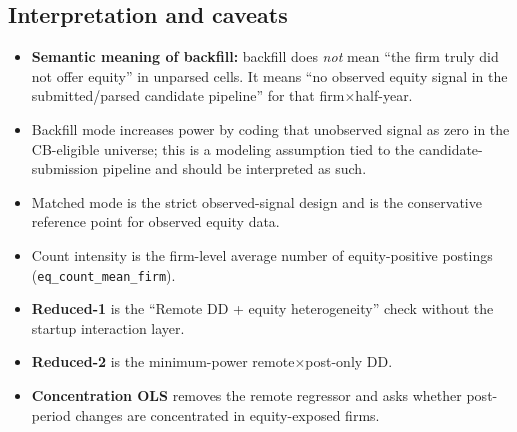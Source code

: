 \documentclass{article}
\newcommand{\cleanedresultsdir}{../../results/cleaned/tex}
\newcommand{\TableInput}[2][\linewidth]{}
\begin{document}
\begin{table}[H]
  \centering
  \caption{User productivity: reduced-2 (Remote $\times$ Post only DD)}
  \TableInput{\cleanedresultsdir/llm_equity_cb_modes_user_simple_dd.tex}
\end{table}

\begin{table}[H]
  \centering
  \caption{User productivity: concentration OLS (equity exposure $\times$ post, extensive margin)}
  \TableInput{\cleanedresultsdir/llm_equity_cb_modes_user_concentration_any.tex}
\end{table}

\begin{table}[H]
  \centering
  \caption{User productivity: concentration OLS (equity exposure $\times$ post, share intensity)}
  \TableInput{\cleanedresultsdir/llm_equity_cb_modes_user_concentration_share.tex}
\end{table}

\begin{table}[H]
  \centering
  \caption{User productivity: concentration OLS (equity exposure $\times$ post, count intensity)}
  \TableInput{\cleanedresultsdir/llm_equity_cb_modes_user_concentration_count_mean.tex}
\end{table}

\subsection*{Interpretation and caveats}
\begin{itemize}
  \item \textbf{Semantic meaning of backfill:} backfill does \emph{not} mean ``the firm truly did not offer equity'' in unparsed cells. It means ``no observed equity signal in the submitted/parsed candidate pipeline'' for that firm$\times$half-year.
  \item Backfill mode increases power by coding that unobserved signal as zero in the CB-eligible universe; this is a modeling assumption tied to the candidate-submission pipeline and should be interpreted as such.
  \item Matched mode is the strict observed-signal design and is the conservative reference point for observed equity data.
  \item Count intensity is the firm-level average number of equity-positive postings (\texttt{eq\_count\_mean\_firm}).
  \item \textbf{Reduced-1} is the ``Remote DD + equity heterogeneity'' check without the startup interaction layer.
  \item \textbf{Reduced-2} is the minimum-power remote$\times$post-only DD.
  \item \textbf{Concentration OLS} removes the remote regressor and asks whether post-period changes are concentrated in equity-exposed firms.
\end{itemize}
\end{document}
